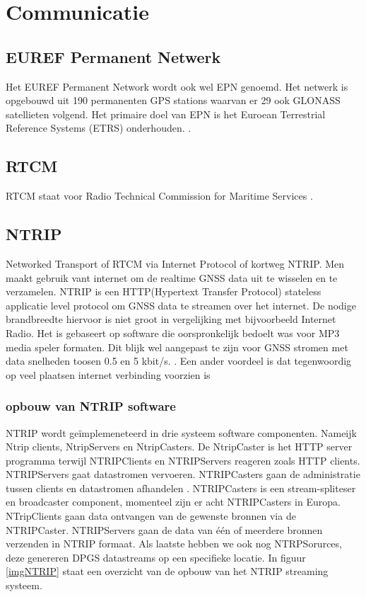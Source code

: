 \section{Communicatie}
\label{LCom}
\subsection{EUREF Permanent Netwerk}
Het EUREF Permanent Network wordt ook wel EPN genoemd. Het netwerk is opgebouwd uit 190 permanenten GPS stations waarvan er 29 ook GLONASS satellieten volgend. Het primaire doel van EPN is het Euroean Terrestrial Reference Systems (ETRS) onderhouden. \cite{LBibEPN}.

\subsection{RTCM}
RTCM staat voor Radio Technical Commission for Maritime Services \cite{LBibGLONASS}.

\subsection{NTRIP}
\label{LNTR}
Networked Transport of RTCM via Internet Protocol of kortweg NTRIP. Men maakt gebruik vant internet om de realtime GNSS data uit te wisselen en te verzamelen. NTRIP is een HTTP(Hypertext Transfer Protocol) stateless applicatie level protocol om GNSS data te streamen over het internet. De nodige brandbreedte hiervoor is niet groot in vergelijking met bijvoorbeeld Internet Radio\cite{LBibNTRIP}. Het is gebaseert op software die oorspronkelijk bedoelt was voor MP3 media speler formaten. Dit blijk wel aangepast te zijn voor GNSS stromen met data snelheden toosen 0.5 en 5 kbit/s. \cite{LBibGPS}. Een ander voordeel is dat tegenwoordig op veel plaatsen internet verbinding voorzien is \cite{LBibNTRIP}

\subsubsection{opbouw van NTRIP software}
\label{LONS}
NTRIP wordt ge\"implemeneteerd in drie systeem software componenten. Nameijk Ntrip clients, NtripServers en NtripCasters. De NtripCaster is het HTTP server programma terwijl NTRIPClients en NTRIPServers reageren zoals HTTP clients\cite{LBibNTRIP}. NTRIPServers gaat datastromen vervoeren. NTRIPCasters gaan de administratie tussen clients en datastromen afhandelen \cite{LBibGPS}. NTRIPCasters is een stream-spliteser en broadcaster component, momenteel zijn er acht NTRIPCasters in Europa. NTripClients gaan data ontvangen van de gewenste bronnen via de NTRIPCaster. NTRIPServers gaan de data van \'e\'en of meerdere bronnen verzenden in NTRIP formaat. Als laatste hebben we ook nog NTRPSorurces, deze genereren DPGS datastreams op een specifieke locatie. \cite{LBibNTRIP} In figuur \ref{imgNTRIP} staat een overzicht van de opbouw van het NTRIP streaming systeem.


